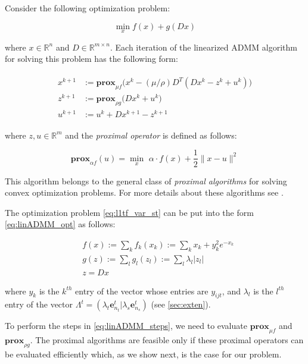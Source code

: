 \documentclass{article}
\begin{document}
Consider the following optimization problem:

\begin{equation}
\min_x f(x)+g(Dx)
\label{eq:linADMM_opt}
\end{equation} 

 where $x\in \mathbb{R}^n$ and $D\in \mathbb{R}^{m\times n}$. Each iteration of the linearized ADMM algorithm for solving this problem has the following form:

\begin{eqnarray}
\begin{aligned}
x^{k+1} & := \textbf{prox}_{\mu f} \big(x^k - (\mu/\rho)D^T (D x^k - z^k + u^k )\big)\\
z^{k+1} & := \textbf{prox}_{\rho g} \big(D x^k + u^k\big)\\
u^{k+1} & := u^k + D x^{k+1} - z^{k+1}
\end{aligned}
\label{eq:linADMM_steps}
\end{eqnarray}

 where $z,u\in \mathbb{R}^m$ and the \textit{proximal operator} is defined as follows:

\begin{equation}
 \textbf{prox}_{\alpha f}(u) = \min_x \,\, \alpha \cdot f(x)+\frac{1}{2} \lVert x-u \rVert^2
\label{eq:linADMM_prox}
\end{equation}

This algorithm belongs to the general class of \textit{proximal algorithms} for solving convex optimization problems. For more details about these algorithms see \citep{parikh_proximal_2014}. 

The optimization problem \eqref{eq:l1tf_var_st} can be put into the form \eqref{eq:linADMM_opt} as follows:

\begin{equation}
\begin{aligned}
& f(x):= \sum_{k} f_k(x_k) := \sum_{k}x_k+y_{k}^2e^{-x_{k}}\\
& g(z):= \sum_{l} g_l(z_l) := \sum_{l} \lambda_l |z_l|\\
& z= Dx
\end{aligned}
\label{eq:linADMM_fg}
\end{equation}

 where $y_k$ is the $k^{th}$ entry of the vector whose entries are $y_{ijt}$, and $\lambda_l$ is the $l^{th}$ entry of the vector $\Lambda^t=(\lambda_t\textbf{e}_{n_t}^t|\lambda_s\textbf{e}_{n_s}^t)$ (see \autoref{sec:exten}).

To perform the steps in \eqref{eq:linADMM_steps}, we need to evaluate $\textbf{prox}_{\mu f}$ and $\textbf{prox}_{\rho g}$. The proximal algorithms are feasible only if these proximal operators can be evaluated efficiently which, as we show next, is the case for our problem. 
\end{document}
